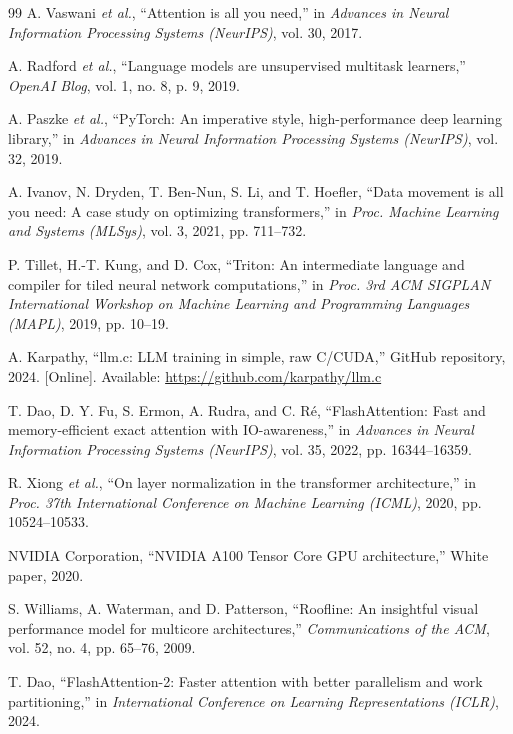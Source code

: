 \documentclass[conference]{IEEEtran}
\begin{document}
\begin{thebibliography}{99}
A. Vaswani \textit{et al.}, ``Attention is all you need,'' in \textit{Advances in Neural Information Processing Systems (NeurIPS)}, vol. 30, 2017.

A. Radford \textit{et al.}, ``Language models are unsupervised multitask learners,'' \textit{OpenAI Blog}, vol. 1, no. 8, p. 9, 2019.

A. Paszke \textit{et al.}, ``PyTorch: An imperative style, high-performance deep learning library,'' in \textit{Advances in Neural Information Processing Systems (NeurIPS)}, vol. 32, 2019.

A. Ivanov, N. Dryden, T. Ben-Nun, S. Li, and T. Hoefler, ``Data movement is all you need: A case study on optimizing transformers,'' in \textit{Proc. Machine Learning and Systems (MLSys)}, vol. 3, 2021, pp. 711--732.

P. Tillet, H.-T. Kung, and D. Cox, ``Triton: An intermediate language and compiler for tiled neural network computations,'' in \textit{Proc. 3rd ACM SIGPLAN International Workshop on Machine Learning and Programming Languages (MAPL)}, 2019, pp. 10--19.

A. Karpathy, ``llm.c: LLM training in simple, raw C/CUDA,'' GitHub repository, 2024. [Online]. Available: \url{https://github.com/karpathy/llm.c}

T. Dao, D. Y. Fu, S. Ermon, A. Rudra, and C. R{\'e}, ``FlashAttention: Fast and memory-efficient exact attention with IO-awareness,'' in \textit{Advances in Neural Information Processing Systems (NeurIPS)}, vol. 35, 2022, pp. 16344--16359.

R. Xiong \textit{et al.}, ``On layer normalization in the transformer architecture,'' in \textit{Proc. 37th International Conference on Machine Learning (ICML)}, 2020, pp. 10524--10533.

NVIDIA Corporation, ``NVIDIA A100 Tensor Core GPU architecture,'' White paper, 2020.

S. Williams, A. Waterman, and D. Patterson, ``Roofline: An insightful visual performance model for multicore architectures,'' \textit{Communications of the ACM}, vol. 52, no. 4, pp. 65--76, 2009.

T. Dao, ``FlashAttention-2: Faster attention with better parallelism and work partitioning,'' in \textit{International Conference on Learning Representations (ICLR)}, 2024.


\end{thebibliography}
\end{document}

